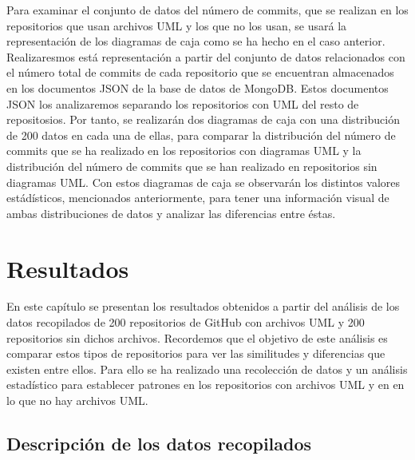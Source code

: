 \documentclass[a4paper, 12pt]{book}
\begin{document}
Para examinar el conjunto de datos del número de commits, que se realizan en los repositorios que usan archivos UML y los que no los usan, se usará la representación de  los diagramas de caja como se ha hecho en el caso anterior.
Realizaresmos está representación a partir del conjunto de datos relacionados con el número total de commits de cada repositorio que se encuentran almacenados en los documentos JSON de la base de datos de MongoDB.
Estos documentos JSON los analizaremos separando los repositorios con UML del resto de repositosios. 
Por tanto, se realizarán dos diagramas de caja con una distribución de 200 datos en cada una de ellas, para comparar la distribución del número de commits que se ha realizado en los repositorios con diagramas UML y la distribución del número de commits que se han realizado en repositorios sin diagramas UML.
Con estos diagramas de caja se observarán los distintos valores estádísticos, mencionados anteriormente, para tener una información visual de ambas distribuciones de datos y analizar las diferencias entre éstas.  



\cleardoublepage
\chapter{Resultados}
\label{chap:resultados}

 
En este capítulo se presentan los resultados obtenidos a partir del análisis de los datos recopilados de 200 repositorios de GitHub con archivos UML y 200 repositorios sin dichos archivos.
Recordemos que el objetivo de este análisis es comparar estos tipos de repositorios para ver las similitudes y diferencias que existen entre ellos.
Para ello se ha realizado una recolección de datos y un análisis estadístico para establecer patrones en los repositorios con archivos UML y en en lo que no hay archivos UML.


\section{Descripción de los datos recopilados}
\label{sec:descripción de los datos recopilado}
\end{document}
